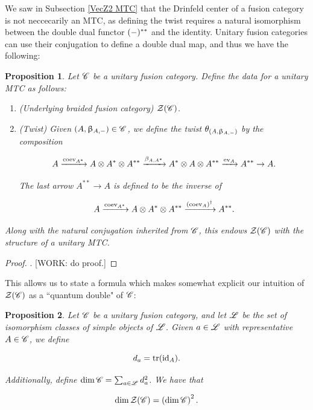 \documentclass{article}
\newtheorem{proposition}{Proposition}[section]
\theoremstyle{definition}
\numberwithin{figure}{section}
\begin{document}
We saw in Subsection \ref{VecZ2 MTC} that the Drinfeld center of a fusion category is not neccecarily an MTC, as defining the twist requires a natural isomorphism between the double dual functor $(\--)^{**}$ and the identity. Unitary fusion categories can use their conjugation to define a double dual map, and thus we have the following:

\begin{proposition}\label{unitary MTC} Let $\mathscr{C}$ be a unitary fusion category. Define the data for a unitary MTC as follows:

\begin{enumerate}
\item (Underlying braided fusion category) $\mathcal{Z}(\mathscr{C})$.

\item (Twist) Given $(A,\upbeta_{A,\--})\in \mathscr{C}$, we define the twist $\theta_{(A,\upbeta_{A,\--})}$ by the composition

$$A\xrightarrow{\mathrm{coev}_{A^*}}A\otimes A^{*}\otimes A^{**}\xrightarrow{\beta_{A,A^*}}A^*\otimes A\otimes A^{**}\xrightarrow{\mathrm{ev}_{A}}A^{**}\to A.$$

The last arrow $A^{**}\to A$ is defined to be the inverse of

$$A\xrightarrow{\mathrm{coev}_{A^*}}A\otimes A^*\otimes A^{**}\xrightarrow{\left(\mathrm{coev}_{A}\right)^{\dagger}}A^{**}.$$
\end{enumerate}

Along with the natural conjugation inherited from $\mathscr{C}$, this endows $\mathcal{Z}(\mathscr{C})$ with the structure of a unitary MTC.
\end{proposition}
\begin{proof}. [WORK: do proof.]
\end{proof}

This allows us to state a formula which makes somewhat explicit our intuition of $\mathcal{Z}(\mathscr{C})$ as a ``quantum double" of $\mathscr{C}$:

\begin{proposition} Let $\mathscr{C}$ be a unitary fusion category, and let $\mathscr{L}$ be the set of isomorphism classes of simple objects of $\mathscr{L}$. Given $a\in \mathscr{L}$ with representative $A\in \mathscr{C}$, we define

$$d_a=\mathrm{tr}(\mathrm{id}_A).$$

Additionally, define $\dim \mathscr{C} = \sum_{a\in \mathscr{L}}d_a^2$. We have that

$$\dim \mathcal{Z}(\mathscr{C}) = \left(\dim \mathscr{C} \right)^2.$$
\end{proposition}
\end{document}

